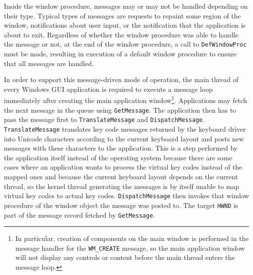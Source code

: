 \documentclass[10pt,twocolumn,a4paper]{article}
\begin{document}
			Inside the window procedure, messages may or may not be handled depending
			on their type. Typical types of messages are requests to repaint some
			region of the window, notifications about user input, or the notification
			that the application is about to exit. Regardless of whether the window
			procedure was able to handle the message or not, at the end of the
			window procedure, a call to \texttt{DefWindowProc} must be made, resulting
			in execution of a default window procedure to ensure that all messages
			are handled.

			In order to support this message-driven mode of operation, the main
			thread of every Windows GUI application is required to execute a
			message loop immediately after creating the main application
			window\footnote{In particular, creation of components on the main
			window is performed in the message handler for the
			\texttt{WM\_CREATE} message, so the main application window will
			not display any controls or content before the main thread enters
			the message loop.}. Applications may fetch the next message in the
			queue using \texttt{GetMessage}. The application then has to pass
			the message first to \texttt{TranslateMessage} and
			\texttt{DispatchMessage}. \texttt{TranslateMessage} translates key
			code messages returned by the keyboard driver into Unicode
			characters according to the current keyboard layout and posts new
			messages with these characters to the application. This is a step performed
			by the application itself instead of the operating system because
			there are some cases where an application wants to process the virtual
			key codes instead of the mapped ones and because the current keyboard
			layout depends on the current thread, so the kernel thread generating
			the messages is by itself unable to map virtual key codes to actual
			key codes. \texttt{DispatchMessage} then invokes that window procedure
			of the window object the message was posted to. The target \texttt{HWND}
			is part of the message record fetched by \texttt{GetMessage}.
\end{document}
